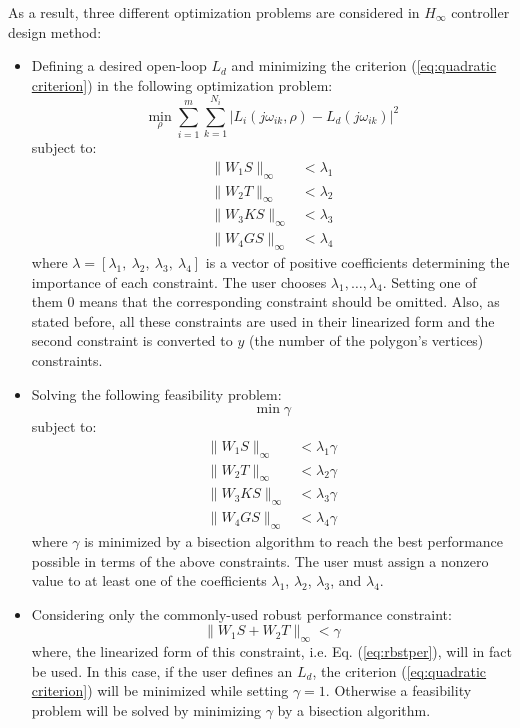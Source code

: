 \documentclass [12pt , a4paper] {article}
\begin{document}
As a result, three different optimization problems are considered in $H_\infty$ controller design method:
\begin{itemize} 
\item Defining a desired open-loop $L_d$ and minimizing the criterion (\ref{eq:quadratic criterion}) in the following optimization problem:
\[
\min_\rho{\sum_{i=1}^{m}\sum_{k=1}^{N_i} |L_i(j\omega_{ik},\rho)-L_d(j\omega_{ik})|^2}
\]
subject to:
\begin{align}
\label{eq:opHinf1}
 \|W_1S\|_\infty&<\lambda_1 \nonumber \\
 \|W_2T\|_\infty&<\lambda_2  \\
 \|W_3KS\|_\infty&<\lambda_3 \nonumber \\
 \|W_4GS\|_\infty&<\lambda_4 \nonumber
\end{align}
where $\lambda=[\lambda_1, \: \lambda_2, \: \lambda_3, \: \lambda_4]$ is a vector of positive coefficients determining the importance of each constraint. The user chooses $\lambda_1,\ldots,\lambda_4$. Setting one of them $0$ means that the corresponding constraint should be omitted. Also, as stated before, all these constraints are used in their linearized form and the second constraint is converted to $y$ (the number of the polygon's vertices) constraints.
\item Solving the following feasibility problem:
\[
\min{\gamma}
\]
subject to:
\begin{align}
\label{eq:opHinf2}
 \|W_1S\|_\infty &<\lambda_1\gamma \nonumber \\
 \|W_2T\|_\infty &<\lambda_2\gamma  \\
 \|W_3KS\|_\infty &<\lambda_3\gamma \nonumber \\
 \|W_4GS\|_\infty &<\lambda_4\gamma \nonumber 
\end{align}
where $\gamma$ is minimized by a bisection algorithm to reach the best performance possible in terms of the above constraints. The user must assign a nonzero value to at least one of the coefficients $\lambda_1$, $\lambda_2$, $\lambda_3$, and $\lambda_4$.
\item Considering only the commonly-used robust performance constraint:
 \begin{equation}
\label{eq:justrbstper}
 \|W_1S+W_2T\|_\infty<\gamma
\end{equation}
where, the linearized form of this constraint, i.e. Eq. (\ref{eq:rbstper}), will in fact be used. In this case, if the user defines an $L_d$, the criterion (\ref{eq:quadratic criterion}) will be minimized while setting $\gamma=1$. Otherwise a feasibility problem will be solved by minimizing $\gamma$ by a bisection algorithm.
\end{itemize}
\end{document}
